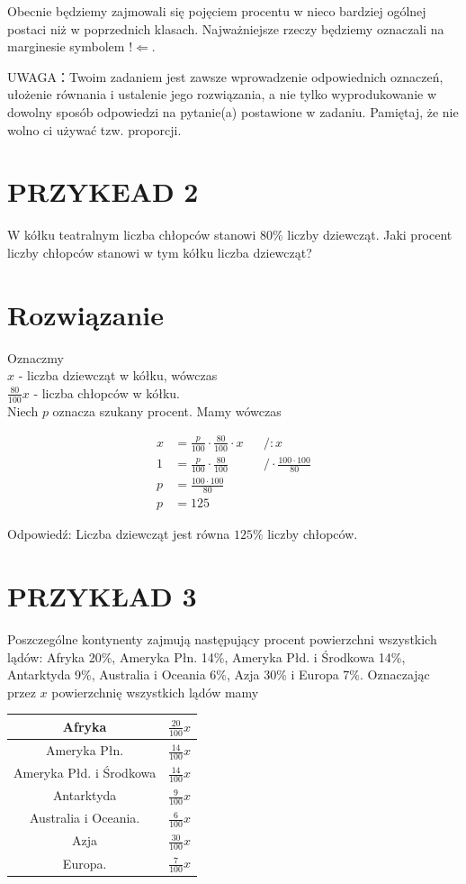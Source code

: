 \documentclass[10pt]{article}
\begin{document}
Obecnie będziemy zajmowali się pojęciem procentu w nieco bardziej ogólnej postaci niż w poprzednich klasach. Najważniejsze rzeczy będziemy oznaczali na marginesie symbolem \(!\Leftarrow\).

UWAGA：Twoim zadaniem jest zawsze wprowadzenie odpowiednich oznaczeń, ułożenie równania i ustalenie jego rozwiązania, a nie tylko wyprodukowanie w dowolny sposób odpowiedzi na pytanie(a) postawione w zadaniu. Pamiętaj, że nie wolno ci używać tzw. proporcji.

\section*{PRZYKEAD 2}
W kółku teatralnym liczba chłopców stanowi \(80 \%\) liczby dziewcząt. Jaki procent liczby chłopców stanowi w tym kółku liczba dziewcząt?

\section*{Rozwiązanie}
Oznaczmy\\
\(x\) - liczba dziewcząt w kółku, wówczas\\
\(\frac{80}{100} x\) - liczba chłopców w kółku.\\
Niech \(p\) oznacza szukany procent. Mamy wówczas

\[
\begin{aligned}
x & =\frac{p}{100} \cdot \frac{80}{100} \cdot x & & /: x \\
1 & =\frac{p}{100} \cdot \frac{80}{100} & & / \cdot \frac{100 \cdot 100}{80} \\
p & =\frac{100 \cdot 100}{80} & & \\
p & =125 & &
\end{aligned}
\]

Odpowiedź: Liczba dziewcząt jest równa \(125 \%\) liczby chłopców.

\section*{PRZYKŁAD 3}
Poszczególne kontynenty zajmują następujący procent powierzchni wszystkich lądów: Afryka 20\%, Ameryka Płn. 14\%, Ameryka Płd. i Środkowa 14\%, Antarktyda 9\%, Australia i Oceania 6\%, Azja 30\% i Europa 7\%. Oznaczając przez \(x\) powierzchnię wszystkich lądów mamy

\begin{center}
\begin{tabular}{|c|c|}
\hline
Afryka & \(\frac{20}{100} x\) \\
\hline
Ameryka Płn. & \(\frac{14}{100} x\) \\
\hline
Ameryka Płd. i Środkowa & \(\frac{14}{100} x\) \\
\hline
Antarktyda & \(\frac{9}{100} x\) \\
\hline
Australia i Oceania. & \(\frac{6}{100} x\) \\
\hline
Azja & \(\frac{30}{100} x\) \\
\hline
Europa. & \(\frac{7}{100} x\) \\
\hline
\end{tabular}
\end{center}
\end{document}
